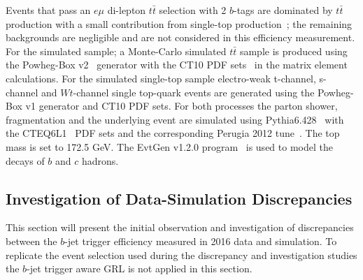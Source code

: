 Events that pass an $e\mu$ di-lepton $t\bar{t}$ selection with 2 $b$-tags
are dominated by $t\bar{t}$ production with a small contribution from single-top production~\cite{trig-ttbar};
the remaining backgrounds are negligible and are not considered in this efficiency measurement.
For the simulated sample; a Monte-Carlo simulated $t\bar{t}$ sample is produced using the
Powheg-Box v2~\cite{trig-powheg} generator with the CT10 PDF sets~\cite{trig-CT10} in the matrix element calculations.
For the simulated single-top sample electro-weak t-channel, s-channel and $Wt$-channel single top-quark events are generated using the Powheg-Box v1 generator and CT10 PDF sets.
For both processes the parton shower, fragmentation and the underlying event are simulated using Pythia6.428~\cite{trig-pythia6} with the CTEQ6L1~\cite{trig-CTEQ6L1} PDF sets
and the corresponding Perugia 2012 tune~\cite{trig-perugia}.
The top mass is set to 172.5 GeV.
The EvtGen v1.2.0 program~\cite{trig-evtGen} is used to model the decays of $b$ and $c$ hadrons.

\subsection{Investigation of Data-Simulation Discrepancies}
\label{sec:trig-inv}

This section will present the initial observation and investigation of discrepancies between the $b$-jet trigger efficiency measured in 2016 data and simulation.
To replicate the event selection used during the discrepancy and investigation studies the $b$-jet trigger aware GRL is not applied in this section.

